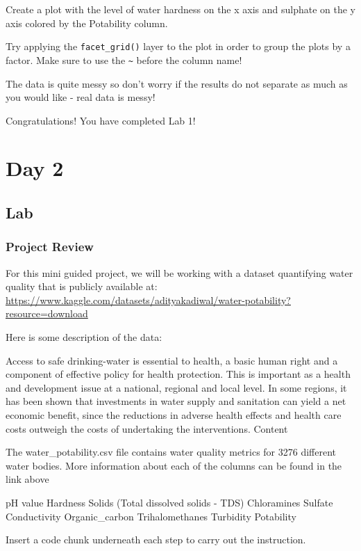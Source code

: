\documentclass[
]{book}
\begin{document}
Create a plot with the level of water hardness on the x axis and sulphate on the y axis colored by the Potability column.

Try applying the \texttt{facet\_grid()} layer to the plot in order to group the plots by a factor. Make sure to use the \texttt{\textasciitilde{}} before the column name!

The data is quite messy so don't worry if the results do not separate as much as you would like - real data is messy!

Congratulations! You have completed Lab 1!

\chapter{Day 2}\label{day-2}

\section{Lab}\label{lab-1}

\subsection{Project Review}\label{project-review}

For this mini guided project, we will be working with a dataset quantifying water quality that is publicly available at: \url{https://www.kaggle.com/datasets/adityakadiwal/water-potability?resource=download}

Here is some description of the data:

Access to safe drinking-water is essential to health, a basic human right and a component of effective policy for health protection. This is important as a health and development issue at a national, regional and local level. In some regions, it has been shown that investments in water supply and sanitation can yield a net economic benefit, since the reductions in adverse health effects and health care costs outweigh the costs of undertaking the interventions.
Content

The water\_potability.csv file contains water quality metrics for 3276 different water bodies. More information about each of the columns can be found in the link above

pH value
Hardness
Solids (Total dissolved solids - TDS)
Chloramines
Sulfate
Conductivity
Organic\_carbon
Trihalomethanes
Turbidity
Potability

Insert a code chunk underneath each step to carry out the instruction.
\end{document}
